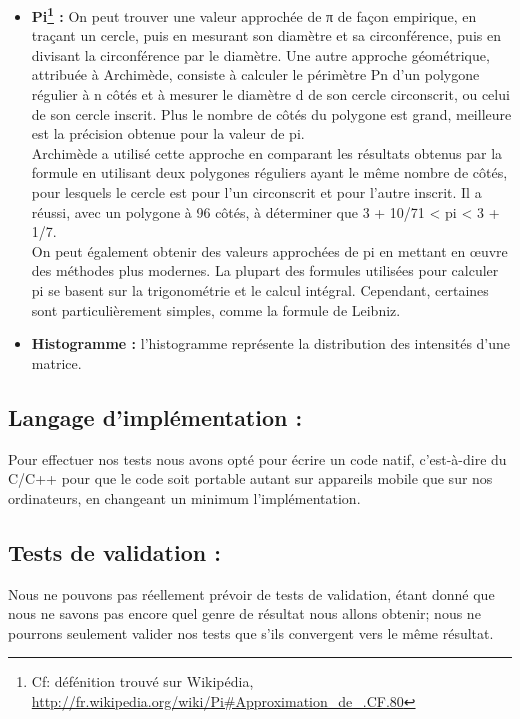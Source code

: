 \begin{itemize}
	\newpage
	\item{ \textbf{Pi\footnote{Cf: défénition trouvé sur Wikipédia, \url{http://fr.wikipedia.org/wiki/Pi#Approximation_de_.CF.80}} :} On peut trouver une valeur approchée de π de façon empirique, en traçant un cercle, puis en mesurant son diamètre et sa circonférence, puis en divisant la circonférence par le diamètre. Une autre approche géométrique, attribuée à Archimède, consiste à calculer le périmètre Pn d’un polygone régulier à n côtés et à mesurer le diamètre d de son cercle circonscrit, ou celui de son cercle inscrit. Plus le nombre de côtés du polygone est grand, meilleure est la précision obtenue pour la valeur de pi.\\
	Archimède a utilisé cette approche en comparant les résultats obtenus par la formule en utilisant deux polygones réguliers ayant le même nombre de côtés, pour lesquels le cercle est pour l’un circonscrit et pour l’autre inscrit. Il a réussi, avec un polygone à 96 côtés, à déterminer que 3 + 10/71 < pi < 3 + 1/7.\\
	On peut également obtenir des valeurs approchées de pi en mettant en œuvre des méthodes plus modernes. La plupart des formules utilisées pour calculer pi se basent sur la trigonométrie et le calcul intégral. Cependant, certaines sont particulièrement simples, comme la formule de Leibniz. \\}

	\item{ \textbf{Histogramme :} l’histogramme représente la distribution des intensités d'une matrice.}
	\end{itemize}

	\subsection*{Langage d'implémentation :}
		Pour effectuer nos tests nous avons opté pour écrire un code natif, c'est-à-dire du C/C++ pour que le code soit portable autant sur appareils mobile que sur nos ordinateurs, en changeant un minimum l'implémentation. 

	\subsection*{Tests de validation :}
		Nous ne pouvons pas réellement prévoir de tests de validation, étant donné que nous ne savons pas encore quel genre de résultat nous allons obtenir; nous ne pourrons seulement valider nos tests que s'ils convergent vers le même résultat. 

